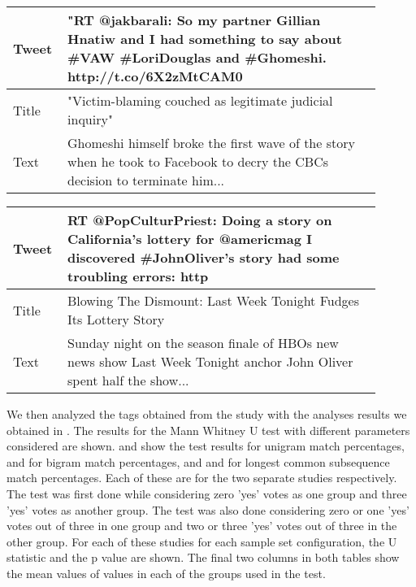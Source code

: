 \begin{table}[!htbp]
\centering
\begin{tabular}{|p{0.1\linewidth}|p{0.8\linewidth}|}
\hline
Tweet & "RT @jakbarali: So my partner Gillian Hnatiw and I had something to say about \#VAW \#LoriDouglas and \#Ghomeshi. http://t.co/6X2zMtCAM0 \\ \hline
Title & "Victim-blaming couched as legitimate judicial inquiry" \\ \hline
Text  & Ghomeshi himself broke the first wave of the story when he took to Facebook to decry the CBCs decision to terminate him... \\ \hline
\end{tabular}
\label{tab:exq2no}
\end{table}

\begin{table}[!htbp]
\centering
\begin{tabular}{|p{0.1\linewidth}|p{0.8\linewidth}|}
\hline
Tweet & RT @PopCulturPriest: Doing a story on California's lottery for @americmag I discovered \#JohnOliver's story had some troubling errors: http \\ \hline
Title & Blowing The Dismount: Last Week Tonight Fudges Its Lottery Story \\ \hline
Text  & Sunday night on the season finale of HBOs new news show Last Week Tonight anchor John Oliver spent half the show... \\ \hline
\end{tabular}
\label{tab:exq2yes}
\end{table}

We then analyzed the tags obtained from the study with the analyses results we obtained in . The results for the Mann Whitney U test \citep{mann1947test,wilcoxon1947probability} with different parameters considered are shown.  and  show the test results for unigram match percentages,  and  for bigram match percentages, and  and  for longest common subsequence match percentages. Each of these are for the two separate studies respectively.  The test was first done while considering zero 'yes' votes as one group and three 'yes' votes as another group. The test was also done considering zero or  one 'yes' votes out of three in one group and two or three 'yes' votes out of three in the other group. For each of these studies for each sample set configuration, the U statistic and the p value are shown. The final two columns in both tables show the mean values of values in each of the groups used in the test. 


